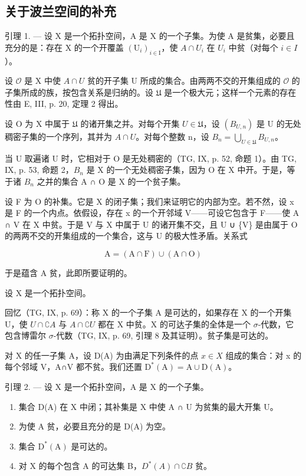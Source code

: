 \subsection{关于波兰空间的补充}

引理 1. --- 设 X 是一个拓扑空间，A 是 X 的一个子集。为使 A 是贫集，必要且充分的是：存在 X 的一个开覆盖 \((\mathrm{U}_{i})_{i\in\mathrm{I}}\)，使 \(A\cap U_{i}\) 在 \(U_{i}\) 中贫（对每个 \(i\in I\)）。

设 \(\mathcal{O}\) 是 X 中使 \(A \cap U\) 贫的开子集 U 所成的集合。由两两不交的开集组成的 \(\mathcal{O}\) 的子集所成的族，按包含关系是归纳的。设 \(\mathfrak{U}\) 是一个极大元；这样一个元素的存在性由 E, III, p. 20, 定理 2 得出。

设 O 为 X 中属于 \(\mathfrak{U}\) 的诸开集之并。对每个开集 \(U \in \mathfrak{U}\)，设 \((B_{U,n})\) 是 U 的无处稠密子集的一个序列，其并为 \(A \cap U\)。对每个整数 n，设 \(B_n = \bigcup_{U \in \mathfrak{U}} B_{U,n}\)。

当 U 取遍诸 U 时，它相对于 O 是无处稠密的（TG, IX, p. 52, 命题 1）。由 TG, IX, p. 53, 命题 2，\(B_{n}\) 是 X 的一个无处稠密子集，因为 O 在 X 中开。于是，等于诸 \(B_{n}\) 之并的集合 A ∩ O 是 X 的一个贫子集。

设 F 为 O 的补集。它是 X 的闭子集；我们来证明它的内部为空。若不然，设 x 是 F 的一个内点。依假设，存在 x 的一个开邻域 V——可设它包含于 F——使 A ∩ V 在 X 中贫。于是 V 与 X 中属于 U 的诸开集不交，且 U ∪ \{V\} 是由属于 O 的两两不交的开集组成的一个集合，这与 U 的极大性矛盾。关系式

\[
\mathrm{A} = (\mathrm{A} \cap \mathrm{F}) \cup (\mathrm{A} \cap \mathrm{O})
\]

于是蕴含 A 贫，此即所要证明的。

设 X 是一个拓扑空间。

回忆（TG, IX, p. 69）：称 X 的一个子集 A 是可达的，如果存在 X 的一个开集 U，使 \(U \cap \complement A\) 与 \(A \cap \complement U\) 都在 X 中贫。X 的可达子集的全体是一个 \(\sigma\)-代数，它包含博雷尔 \(\sigma\)-代数（TG, IX, p. 69, 引理 8 及其证明）。贫子集是可达的。

对 X 的任一子集 A，设 D(A) 为由满足下列条件的点 \(x \in X\) 组成的集合：对 x 的每个邻域 V，A∩V 都不贫。我们还置 \(\mathrm{D}^{*}(\mathrm{A}) = \mathrm{A} \cup \mathrm{D}(\mathrm{A})\)。

引理 2. --- 设 X 是一个拓扑空间，A 是 X 的一个子集。

\begin{enumerate}
\def\labelenumi{\alph{enumi})}
\item
  集合 D(A) 在 X 中闭；其补集是 X 中使 A ∩ U 为贫集的最大开集 U。
\item
  为使 A 贫，必要且充分的是 D(A) 为空。
\item
  集合 \(\mathrm{D}^{*}(\mathrm{A})\) 是可达的。
\item
  对 X 的每个包含 A 的可达集 B，\(D^{*}(A) \cap \complement B\) 贫。
\end{enumerate}

